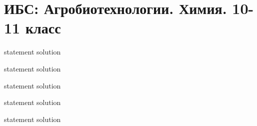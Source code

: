 \chapter{ИБС: Агробиотехнологии. Химия. 10-11 класс}

{statement}
{solution}

{statement}
{solution}

{statement}
{solution}

{statement}
{solution}

{statement}
{solution}